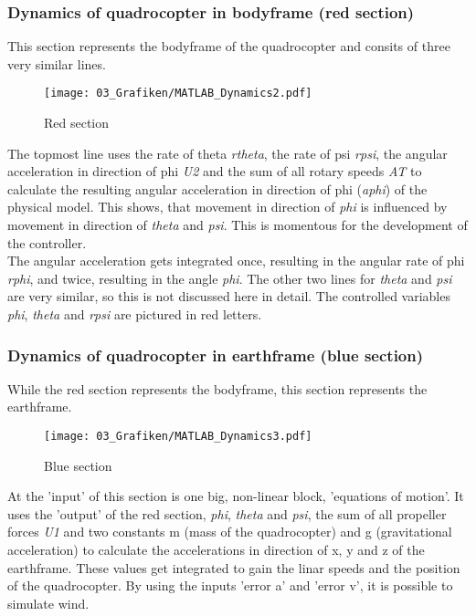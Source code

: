 \subsubsection{Dynamics of quadrocopter in bodyframe (red section)}\label{chapter_RED_SECTION}
This section represents the bodyframe of the quadrocopter and consits of three very similar lines.
\begin{figure}[H]
	\centering
		\texttt{[image: 03\_Grafiken/MATLAB\_Dynamics2.pdf]}
	\caption{Red section}
	\label{fig:MATLAB Dynamics2}
\end{figure}
The topmost line uses the rate of theta \textit{rtheta}, the rate of psi \textit{rpsi}, the angular acceleration in direction of phi \textit{U2} and the sum of all rotary speeds \textit{AT} to calculate the resulting angular acceleration in direction of phi (\textit{aphi}) of the physical model. This shows, that movement in direction of \textit{phi} is influenced by movement in direction of \textit{theta} and \textit{psi}. This is momentous for the development of the controller.\\
The angular acceleration gets integrated once, resulting in the angular rate of phi \textit{rphi}, and twice, resulting in the angle \textit{phi}. The other two lines for \textit{theta} and \textit{psi} are very similar, so this is not discussed here in detail. The controlled variables \textit{phi}, \textit{theta} and \textit{rpsi} are pictured in red letters.
 
\subsubsection{Dynamics of quadrocopter in earthframe (blue section)}\label{chapter_BLUE_SECTION}
While the red section represents the bodyframe, this section represents the earthframe.
\begin{figure}[H]
	\centering
		\texttt{[image: 03\_Grafiken/MATLAB\_Dynamics3.pdf]}
	\caption{Blue section}
	\label{fig:MATLAB Dynamics3}
\end{figure}
At the 'input' of this section is one big, non-linear block, 'equations of motion'. It uses the 'output' of the red section, \textit{phi}, \textit{theta} and \textit{psi}, the sum of all propeller forces \textit{U1} and two constants m (mass of the quadrocopter) and g (gravitational acceleration) to calculate the accelerations in direction of x, y and z of the earthframe. These values get integrated to gain the linar speeds and the position of the quadrocopter. By using the inputs 'error a' and 'error v', it is possible to simulate wind.
\clearpage %

